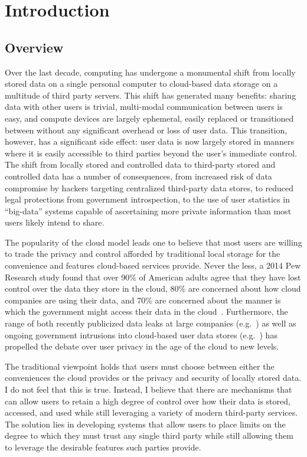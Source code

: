 \chapter{Introduction}
\label{chap:intro}

\section{Overview}

Over the last decade, computing has undergone a monumental shift from
locally stored data on a single personal computer to cloud-based data
storage on a multitude of third party servers. This shift has
generated many benefits: sharing data with other users is trivial,
multi-modal communication between users is easy, and compute devices
are largely ephemeral, easily replaced or transitioned between without
any significant overhead or loss of user data. This transition,
however, has a significant side effect: user data is now largely
stored in manners where it is easily accessible to third parties
beyond the user's immediate control. The shift from locally stored and
controlled data to third-party stored and controlled data has a number
of consequences, from increased risk of data compromise by hackers
targeting centralized third-party data stores, to reduced legal
protections from government introspection, to the use of user
statistics in ``big-data'' systems capable of ascertaining more
private information than most users likely intend to share.

The popularity of the cloud model leads one to believe that most users
are willing to trade the privacy and control afforded by traditional
local storage for the convenience and features cloud-based services
provide. Never the less, a 2014 Pew Research study found that over
90\% of American adults agree that they have lost control over the
data they store in the cloud, 80\% are concerned about how cloud
companies are using their data, and 70\% are concerned about the
manner is which the government might access their data in the
cloud~\cite{pew-privsec14}. Furthermore, the range of both recently
publicized data leaks at large companies
(e.g.~\cite{apple-icloudleak}) as well as ongoing government
intrusions into cloud-based user data stores
(e.g.~\cite{GreenwaldPrism}) has propelled the debate over user
privacy in the age of the cloud to new levels.

The traditional viewpoint holds that users must choose between either
the conveniences the cloud provides or the privacy and security of
locally stored data. I do not feel that this is true. Instead, I
believe that there are mechanisms that can allow users to retain a
high degree of control over how their data is stored, accessed, and
used while still leveraging a variety of modern third-party
services. The solution lies in developing systems that allow users to
place limits on the degree to which they must trust any single third
party while still allowing them to leverage the desirable features such
parties provide.

